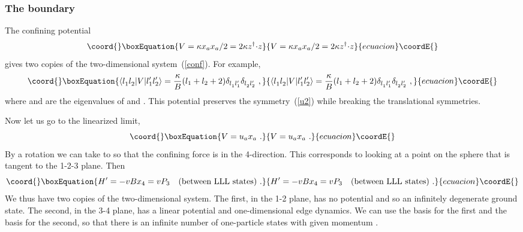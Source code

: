 \documentclass[a4paper,12pt]{article}
\begin{document}
\subsubsection{The boundary}

The confining potential 
\begin{equation}\coord{}\boxEquation{
V = \kappa x_a x_a / 2 = {2\kappa} z^\dagger{\cdot} z
\label{confour}
}{
V = \kappa x_a x_a / 2 = {2\kappa} z^\dagger{\cdot} z
}{ecuacion}\coordE{}\end{equation}
gives two copies of the two-dimensional system~(\ref{conf}).  For example,
\begin{equation}\coord{}\boxEquation{
\langle l^{\vphantom\prime}_1 l^{\vphantom\prime}_2 | V | l_1' l_2'\rangle
=
\frac{\kappa}{B} (l_1 + l_2 +2)
\delta_{l^{\vphantom\prime}_1 l_1'}
\delta_{l^{\vphantom\prime}_2 l_2'}\ ,
}{
\langle l^{\vphantom\prime}_1 l^{\vphantom\prime}_2 | V | l_1' l_2'\rangle
=
\frac{\kappa}{B} (l_1 + l_2 +2)
\delta_{l^{\vphantom\prime}_1 l_1'}
\delta_{l^{\vphantom\prime}_2 l_2'}\ ,
}{ecuacion}\coordE{}\end{equation}
where \coordHE{} and \coordHE{} are the eigenvalues of \coordHE{} and \coordHE{}.  This
potential preserves the \coordHE{} symmetry~(\ref{u2}) while breaking the
translational symmetries.

Now let us go to the linearized limit,
\begin{equation}\coord{}\boxEquation{
V = u_a x_a\ .
\label{linfour}
}{
V = u_a x_a\ .
}{ecuacion}\coordE{}\end{equation}
By a \coordHE{} rotation we can take \coordHE{} to
\coordHE{} so that the confining force is in the 4-direction.  This
corresponds to looking at a point on the sphere that is tangent to the
1-2-3 plane.  Then 
\begin{equation}\coord{}\boxEquation{
H' = -v B x_4 = v P_3\quad (\mbox{between LLL states})\ .
}{
H' = -v B x_4 = v P_3\quad (\mbox{between LLL states})\ .
}{ecuacion}\coordE{}\end{equation}
We thus have two copies of the two-dimensional system. 
The first, in the 1-2 plane, has no potential and so an
infinitely degenerate ground state.  The second, in the 3-4 plane, has a
linear potential and one-dimensional edge dynamics.  We can use the
\coordHE{} basis for the first and the
\coordHE{} basis for the second, so that there is an infinite number of
one-particle states \coordHE{} with given momentum \coordHE{}.
\end{document}
